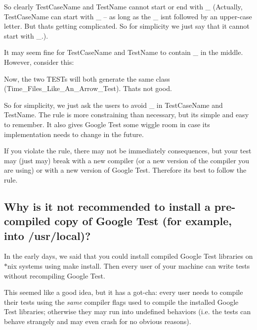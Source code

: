 So clearly {\ttfamily Test\+Case\+Name} and {\ttfamily Test\+Name} cannot start or end with {\ttfamily \+\_\+} (Actually, {\ttfamily Test\+Case\+Name} can start with {\ttfamily \+\_\+} -- as long as the {\ttfamily \+\_\+} isn\textquotesingle{}t followed by an upper-\/case letter. But that\textquotesingle{}s getting complicated. So for simplicity we just say that it cannot start with {\ttfamily \+\_\+}.).

It may seem fine for {\ttfamily Test\+Case\+Name} and {\ttfamily Test\+Name} to contain {\ttfamily \+\_\+} in the middle. However, consider this\+: 
\begin{DoxyCode}{0}
\end{DoxyCode}


Now, the two {\ttfamily T\+E\+ST}s will both generate the same class ({\ttfamily Time\+\_\+\+Files\+\_\+\+Like\+\_\+\+An\+\_\+\+Arrow\+\_\+\+Test}). That\textquotesingle{}s not good.

So for simplicity, we just ask the users to avoid {\ttfamily \+\_\+} in {\ttfamily Test\+Case\+Name} and {\ttfamily Test\+Name}. The rule is more constraining than necessary, but it\textquotesingle{}s simple and easy to remember. It also gives Google Test some wiggle room in case its implementation needs to change in the future.

If you violate the rule, there may not be immediately consequences, but your test may (just may) break with a new compiler (or a new version of the compiler you are using) or with a new version of Google Test. Therefore it\textquotesingle{}s best to follow the rule.

\subsection*{Why is it not recommended to install a pre-\/compiled copy of Google Test (for example, into /usr/local)?}

In the early days, we said that you could install compiled Google Test libraries on {\ttfamily $\ast$}nix systems using {\ttfamily make install}. Then every user of your machine can write tests without recompiling Google Test.

This seemed like a good idea, but it has a got-\/cha\+: every user needs to compile their tests using the {\itshape same} compiler flags used to compile the installed Google Test libraries; otherwise they may run into undefined behaviors (i.\+e. the tests can behave strangely and may even crash for no obvious reasons).

